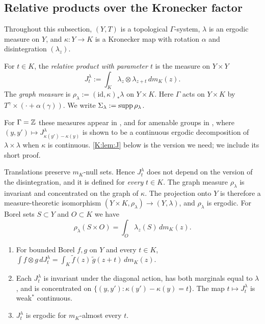 \subsection{Relative products over the Kronecker factor}\label{K:ssec:relprod}

Throughout this subsection, $(Y,T)$ is a topological $\Gamma$-system, $\lambda$ is an ergodic
measure on $Y$, and $\kappa\colon Y\to K$ is a Kronecker map with rotation $\alpha$ and
disintegration $(\lambda_z)$.

\begin{definition}\label{K:def:J}
For $t\in K$, the \emph{relative product with parameter $t$} is the measure on $Y\times Y$
\[
J^\lambda_t:=\int_K\lambda_z\otimes\lambda_{z+t}\,dm_K(z).
\]
The \emph{graph measure} is $\rho_\lambda:=(\mathrm{id},\kappa)_*\lambda$ on $Y\times K$.
Here $\Gamma$ acts on $Y\times K$ by $T^\gamma\times(\cdot+\alpha(\gamma))$.
We write $\Sigma_\lambda:=\operatorname{supp}\rho_\lambda$.
\end{definition}

For $\Gamma=\mathbb{Z}$ these measures appear in \cite[(3.10) and Proposition~3.11]{kra2022infinite},
and for amenable groups in \cite[Definition~4.7 and Theorem~4.8]{charamaras2024finding}, where
$(y,y')\mapsto J^\lambda_{\kappa(y')-\kappa(y)}$ is shown to be a continuous ergodic
decomposition of $\lambda\times\lambda$ when $\kappa$ is continuous. \cref{K:lem:J} below is
the version we need; we include its short proof.

Translations preserve $m_K$-null sets. Hence $J^\lambda_t$ does not depend on the version
of the disintegration, and it is defined for \emph{every} $t\in K$.
The graph measure $\rho_\lambda$ is invariant and concentrated on the graph of $\kappa$.
The projection onto $Y$ is therefore a measure-theoretic isomorphism
$(Y\times K,\rho_\lambda)\to(Y,\lambda)$, and $\rho_\lambda$ is ergodic.
For Borel sets $S\subset Y$ and $O\subset K$ we have
\begin{equation}\label{K:eq:rho}
\rho_\lambda(S\times O)=\int_O\lambda_z(S)\,dm_K(z).
\end{equation}

\begin{lemma}\label{K:lem:J}
\leavevmode
\begin{enumerate}[label=(\alph*)]
\item\label{K:Ja} For bounded Borel $f,g$ on $Y$ and every $t\in K$,
$\int f\otimes g\,dJ^\lambda_t=\int_K\tilde f(z)\,\tilde g(z+t)\,dm_K(z)$.
\item\label{K:Jb} Each $J^\lambda_t$ is invariant under the diagonal action, has both marginals
equal to $\lambda$, and is concentrated on $\{(y,y'):\kappa(y')-\kappa(y)=t\}$.
The map $t\mapsto J^\lambda_t$ is weak$^*$ continuous.
\item\label{K:Jc} $J^\lambda_t$ is ergodic for $m_K$-almost every $t$.
\end{enumerate}
\end{lemma}

